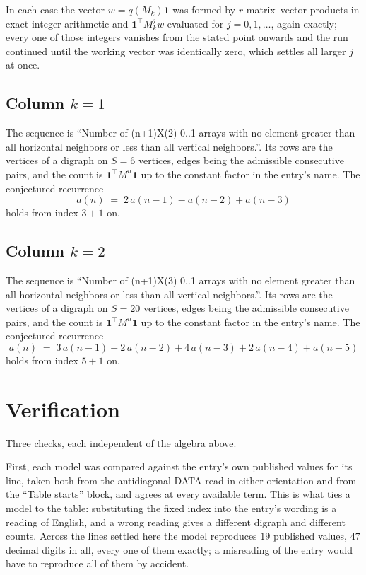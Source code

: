 \documentclass[11pt,a4paper]{article}
\theoremstyle{plain}
\theoremstyle{definition}
\begin{document}
In each case the vector $w=q(M_k)\mathbf{1}$ was formed by $r$ matrix--vector products in
exact integer arithmetic and $\mathbf{1}^{\!\top}M_k^{j}w$ evaluated for $j=0,1,\dots$,
again exactly; every one of those integers vanishes from the stated point onwards and the run
continued until the working vector was identically zero, which settles all larger $j$ at once.

\subsection*{Column $k$$=1$}
The sequence is ``Number of (n+1)X(2) 0..1 arrays with no element greater than all horizontal neighbors or less than all vertical neighbors.''. Its rows are the vertices of a digraph on
$S=6$ vertices, edges being the admissible consecutive pairs, and the count is
$\mathbf{1}^{\!\top}M^{n}\mathbf{1}$ up to the constant factor in the entry's name.
The conjectured recurrence
\[
a(n)\;=\;2\,a(n-1) - a(n-2) + a(n-3)
\]
holds from index $3+1$ on.

\subsection*{Column $k$$=2$}
The sequence is ``Number of (n+1)X(3) 0..1 arrays with no element greater than all horizontal neighbors or less than all vertical neighbors.''. Its rows are the vertices of a digraph on
$S=20$ vertices, edges being the admissible consecutive pairs, and the count is
$\mathbf{1}^{\!\top}M^{n}\mathbf{1}$ up to the constant factor in the entry's name.
The conjectured recurrence
\[
a(n)\;=\;3\,a(n-1) - 2\,a(n-2) + 4\,a(n-3) + 2\,a(n-4) + a(n-5)
\]
holds from index $5+1$ on.

\section{Verification}

Three checks, each independent of the algebra above.

First, each model was compared against the entry's own published values for its line, taken
both from the antidiagonal DATA read in either orientation and from the ``Table starts''
block, and agrees at every available term. This is what ties a model to the table:
substituting the fixed index into the entry's wording is a reading of English, and a wrong
reading gives a different digraph and different counts. Across the lines settled here the
model reproduces $19$ published values, $47$ decimal digits in all, every one of
them exactly; a misreading of the entry would have to reproduce all of them by accident.
\end{document}
